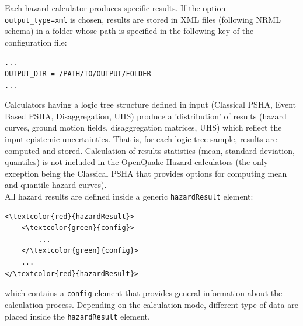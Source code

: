 Each hazard calculator produces specific results. If the option \Verb+--output_type=xml+ is chosen, results are stored in XML files (following NRML schema) in a folder whose path is specified in the following key of the configuration file:
\begin{Verbatim}[frame=single, commandchars=\\\{\}, samepage=true]
...
OUTPUT_DIR = /PATH/TO/OUTPUT/FOLDER
...
\end{Verbatim}
Calculators having a logic tree structure defined in input (Classical PSHA, Event Based PSHA, Disaggregation, UHS) produce a 'distribution' of results (hazard curves, ground motion fields, disaggregation matrices, UHS) which reflect the input epistemic uncertainties. That is,  for each logic tree sample, results are computed and stored. Calculation of results statistics (mean, standard deviation, quantiles) is not included in the OpenQuake Hazard calculators (the only exception being the Classical PSHA that provides options for computing mean and quantile hazard curves).\\
All hazard results are defined inside a generic \Verb+hazardResult+ element:
\begin{Verbatim}[frame=single, commandchars=\\\{\}, samepage=true]
<\textcolor{red}{hazardResult}>
	<\textcolor{green}{config}>
		...
	</\textcolor{green}{config}>
	...
</\textcolor{red}{hazardResult}>
\end{Verbatim}
which contains a \Verb+config+ element that provides general information about the calculation process. Depending on the calculation mode, different type of data are placed inside the \Verb+hazardResult+ element.

